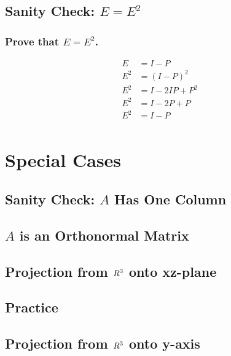 \documentclass[12pt]{beamer}
\begin{document}
\subsection{Sanity Check: $E=E^2$}
\begin{frame}
    \frametitle{Prove that $E = E^2$.}



    \begin{align*}
        E   & = I - P     \\
        E^2 & = (I-P)^2   \\
        E^2 & = I-2IP+P^2 \\
        E^2 & = I-2P+P    \\
        E^2 & = I-P       \\
    \end{align*}
\end{frame}

\section{Special Cases}

\subsection{Sanity Check: $A$ Has One Column}

\subsection{$A$ is an Orthonormal Matrix}

\subsection{Projection from $\boldmath{R}^3$ onto xz-plane}

\subsection{Practice}

\subsection{Projection from $\boldmath{R}^3$ onto y-axis}
\end{document}
